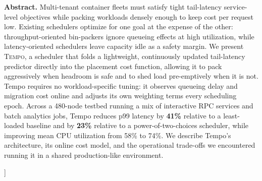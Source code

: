 \documentclass[10pt,twocolumn]{article}
\begin{document}
  \vspace{1.2em}
  \begin{center}
  \begin{minipage}{0.94\textwidth}
    \small
    \textbf{Abstract.}
    Multi-tenant container fleets must satisfy tight tail-latency
    service-level objectives while packing workloads densely enough to keep
    cost per request low. Existing schedulers optimize for one goal at the
    expense of the other: throughput-oriented bin-packers ignore queueing
    effects at high utilization, while latency-oriented schedulers leave
    capacity idle as a safety margin. We present \textsc{Tempo}, a scheduler
    that folds a lightweight, continuously updated tail-latency predictor
    directly into the placement cost function, allowing it to pack
    aggressively when headroom is safe and to shed load pre-emptively when it
    is not. Tempo requires no workload-specific tuning: it observes queueing
    delay and migration cost online and adjusts its own weighting terms every
    scheduling epoch. Across a 480-node testbed running a mix of interactive
    RPC services and batch analytics jobs, Tempo reduces p99 latency by
    \textbf{41\%} relative to a least-loaded baseline and by \textbf{23\%}
    relative to a power-of-two-choices scheduler, while improving mean CPU
    utilization from 58\% to 74\%. We describe Tempo's architecture,
    its online cost model, and the operational trade-offs we encountered
    running it in a shared production-like environment.
  \end{minipage}
  \end{center}
  \vspace{1.4em}
]








\end{document}
